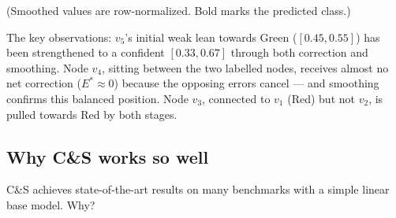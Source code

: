 \begin{notechapter}
\begin{center}
\small
{}
\end{center}
(Smoothed values are row-normalized. Bold marks the predicted class.)

The key observations: $v_5$'s initial weak lean towards Green ($[0.45, 0.55]$)
has been strengthened to a confident $[0.33, 0.67]$ through both correction and
smoothing. Node $v_4$, sitting between the two labelled nodes, receives almost
no net correction ($E^* \approx 0$) because the opposing errors cancel --- and
smoothing confirms this balanced position. Node $v_3$, connected to $v_1$ (Red)
but not $v_2$, is pulled towards Red by both stages.

\subsection{Why C\&S works so well}

C\&S achieves state-of-the-art results on many benchmarks with a simple linear
base model. Why?


\end{notechapter}
